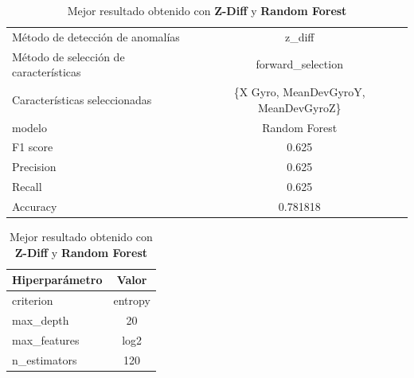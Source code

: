 \begin{appendices}
		\begin{table}[htb]
			\centering
			\caption{Mejor resultado obtenido con \textbf{Z-Diff} y \textbf{Random Forest}}
			\label{table:34}
			\begin{tabular}{lc}
				\toprule
				      Método de detección de anomalías &                               z\_diff \\
				Método de selección de características &                    forward\_selection \\
				         Características seleccionadas & \{X Gyro, MeanDevGyroY, MeanDevGyroZ\} \\
				                                modelo &                        Random Forest \\
				                              F1 score &                                0.625 \\
				                             Precision &                                0.625 \\
				                                Recall &                                0.625 \\
				                              Accuracy &                             0.781818 \\
				\bottomrule
			\end{tabular}
			\newline
			\newline

			\begin{tabular}{lc}
				\toprule
				Hiperparámetro &   Valor \\
				\midrule
					 criterion & entropy \\
					 max\_depth &      20 \\
				  max\_features &    log2 \\
				  n\_estimators &     120 \\
				\bottomrule
			\end{tabular}
			

		\end{table}


\end{appendices}
